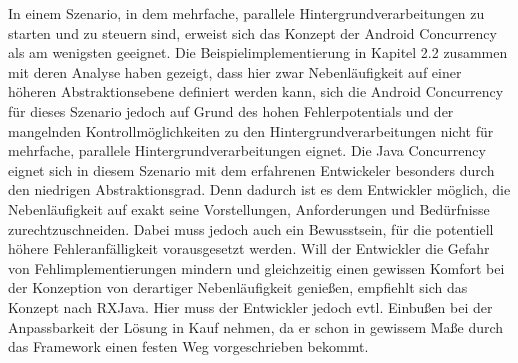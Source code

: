 \documentclass[12pt,oneside,a4paper,bibtotoc,liststotoc]{scrreprt}
\begin{document}
In einem Szenario, in dem mehrfache, parallele Hintergrundverarbeitungen zu starten und zu steuern sind, erweist sich das Konzept der Android Concurrency als am wenigsten geeignet. Die Beispielimplementierung in Kapitel 2.2 zusammen mit deren Analyse haben gezeigt, dass hier zwar Nebenläufigkeit auf einer höheren Abstraktionsebene definiert werden kann, sich die Android Concurrency für dieses Szenario jedoch auf Grund des hohen Fehlerpotentials und der mangelnden Kontrollmöglichkeiten zu den Hintergrundverarbeitungen nicht für mehrfache, parallele Hintergrundverarbeitungen eignet. Die Java Concurrency eignet sich in diesem Szenario mit dem erfahrenen Entwickeler besonders durch den niedrigen Abstraktionsgrad. Denn dadurch ist es dem Entwickler möglich, die Nebenläufigkeit auf exakt seine Vorstellungen, Anforderungen und Bedürfnisse zurechtzuschneiden. Dabei muss jedoch auch ein Bewusstsein, für die potentiell höhere Fehleranfälligkeit vorausgesetzt werden. Will der Entwickler die Gefahr von Fehlimplementierungen mindern und gleichzeitig einen gewissen Komfort bei der Konzeption von derartiger Nebenläufigkeit genießen, empfiehlt sich das Konzept nach RXJava. Hier muss der Entwickler jedoch evtl. Einbußen bei der Anpassbarkeit der Lösung in Kauf nehmen, da er schon in gewissem Maße durch das Framework einen festen Weg vorgeschrieben bekommt.
\end{document}
